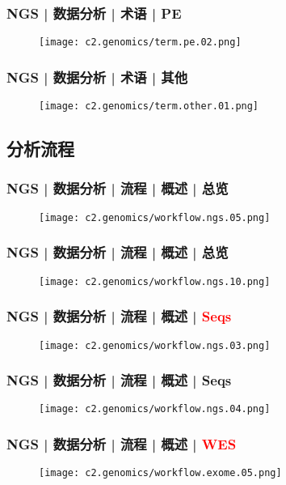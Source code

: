 \begin{frame}
  \frametitle{NGS | 数据分析 | 术语 | PE}
  \begin{figure}
    \centering
    \texttt{[image: c2.genomics/term.pe.02.png]}
  \end{figure}
\end{frame}

\begin{frame}
  \frametitle{NGS | 数据分析 | 术语 | 其他}
  \begin{figure}
    \centering
    \texttt{[image: c2.genomics/term.other.01.png]}
  \end{figure}
\end{frame}

\subsection{分析流程}
\begin{frame}
  \frametitle{NGS | 数据分析 | 流程 | 概述 | 总览}
  \begin{figure}
    \centering
    \texttt{[image: c2.genomics/workflow.ngs.05.png]}
  \end{figure}
\end{frame}

\begin{frame}
  \frametitle{NGS | 数据分析 | 流程 | 概述 | 总览}
  \begin{figure}
    \centering
    \texttt{[image: c2.genomics/workflow.ngs.10.png]}
  \end{figure}
\end{frame}

\begin{frame}
  \frametitle{NGS | 数据分析 | 流程 | 概述 | \textcolor{red}{Seqs}}
  \begin{figure}
    \centering
    \texttt{[image: c2.genomics/workflow.ngs.03.png]}
  \end{figure}
\end{frame}

\begin{frame}
  \frametitle{NGS | 数据分析 | 流程 | 概述 | Seqs}
  \begin{figure}
    \centering
    \texttt{[image: c2.genomics/workflow.ngs.04.png]}
  \end{figure}
\end{frame}

\begin{frame}
  \frametitle{NGS | 数据分析 | 流程 | 概述 | \textcolor{red}{WES}}
  \begin{figure}
    \centering
    \texttt{[image: c2.genomics/workflow.exome.05.png]}
  \end{figure}
\end{frame}

